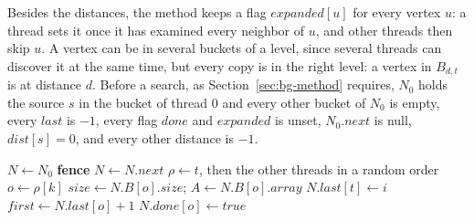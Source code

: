 Besides the distances, the method keeps a flag $\mathit{expanded}[u]$ for every vertex $u$: a thread sets it once it has examined every neighbor of $u$, and other threads then skip $u$. A vertex can be in several buckets of a level, since several threads can discover it at the same time, but every copy is in the right level: a vertex in $B_{d,t}$ is at distance $d$. Before a search, as Section~\ref{sec:bg-method} requires, $N_0$ holds the source $s$ in the bucket of thread $0$ and every other bucket of $N_0$ is empty, every $\mathit{last}$ is $-1$, every flag $\mathit{done}$ and $\mathit{expanded}$ is unset, $N_0.\mathit{next}$ is null, $\mathit{dist}[s] = 0$, and every other distance is $-1$.

\begin{algorithm}
\caption{Wait-free top-down BFS, as thread $t$ runs it. For a node $N = N_d$, $N.B[o]$, $N.\mathit{last}[o]$ and $N.\mathit{done}[o]$ stand for $B_{d,o}$, $\mathit{last}_{d,o}$ and $\mathit{done}_{d,o}$.}
\label{alg:wf-td}
\begin{algorithmic}[1]
    \State $N \gets N_0$
        \State \textbf{fence} \label{ln:td-fence}
        \State {}
        \State $N \gets N.\mathit{next}$ \label{ln:td-next}
    \EndWhile
\EndProcedure
\Statex
{}
    \State $\rho \gets t$, then the other threads in a random order \label{ln:td-order}
        \State $o \gets \rho[k]$
         \label{ln:td-add}
        \State $\mathit{size} \gets N.B[o].\mathit{size}$; $A \gets N.B[o].\mathit{array}$ \label{ln:td-size}
             \label{ln:td-own}
                \State {}
                \State $N.\mathit{last}[t] \gets i$ \label{ln:td-last}
            \EndFor
        \Else
            \State $\mathit{first} \gets N.\mathit{last}[o] + 1$ \label{ln:td-first}
             \label{ln:td-help}
                \State {}
            \EndFor
        \EndIf
        \State $N.\mathit{done}[o] \gets \mathit{true}$ \label{ln:td-done}
    \EndFor
\EndProcedure
\Statex
{}
     \label{ln:td-nbrs}

\end{algorithmic}
\end{algorithm}
